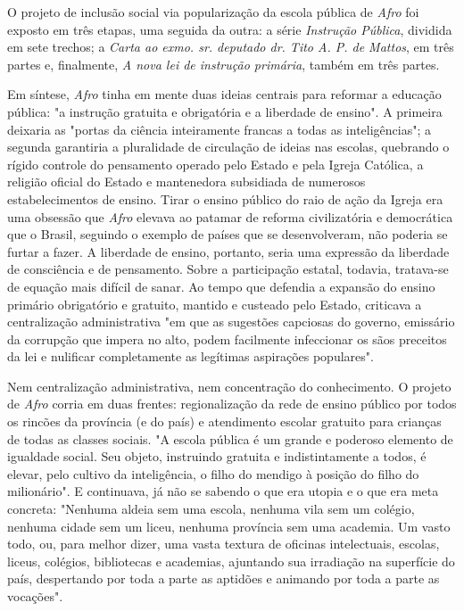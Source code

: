 O projeto de inclusão social via popularização da escola pública de
\emph{Afro} foi exposto em três etapas, uma seguida da outra: a série
\emph{Instrução Pública}, dividida em sete trechos; a \emph{Carta ao
exmo. sr. deputado dr. Tito A. P. de Mattos}, em três partes e,
finalmente, \emph{A nova lei de instrução primária}, também em três
partes.

Em síntese, \emph{Afro} tinha em mente duas ideias centrais para
reformar a educação pública: "a instrução gratuita e obrigatória e a
liberdade de ensino". A primeira deixaria as "portas da ciência
inteiramente francas a todas as inteligências"; a segunda garantiria a
pluralidade de circulação de ideias nas escolas, quebrando o rígido
controle do pensamento operado pelo Estado e pela Igreja Católica, a
religião oficial do Estado e mantenedora subsidiada de numerosos
estabelecimentos de ensino. Tirar o ensino público do raio de ação da
Igreja era uma obsessão que \emph{Afro} elevava ao patamar de reforma
civilizatória e democrática que o Brasil, seguindo o exemplo de países
que se desenvolveram, não poderia se furtar a fazer. A liberdade de
ensino, portanto, seria uma expressão da liberdade de consciência e de
pensamento. Sobre a participação estatal, todavia, tratava-se de equação
mais difícil de sanar. Ao tempo que defendia a expansão do ensino
primário obrigatório e gratuito, mantido e custeado pelo Estado,
criticava a centralização administrativa "em que as sugestões capciosas
do governo, emissário da corrupção que impera no alto, podem facilmente
infeccionar os sãos preceitos da lei e nulificar completamente as
legítimas aspirações populares".

Nem centralização administrativa, nem concentração do conhecimento. O
projeto de \emph{Afro} corria em duas frentes: regionalização da rede de
ensino público por todos os rincões da província (e do país) e
atendimento escolar gratuito para crianças de todas as classes sociais.
"A escola pública é um grande e poderoso elemento de igualdade social.
Seu objeto, instruindo gratuita e indistintamente a todos, é elevar,
pelo cultivo da inteligência, o filho do mendigo à posição do filho do
milionário". E continuava, já não se sabendo o que era utopia e o que
era meta concreta: "Nenhuma aldeia sem uma escola, nenhuma vila sem um
colégio, nenhuma cidade sem um liceu, nenhuma província sem uma
academia. Um vasto todo, ou, para melhor dizer, uma vasta textura de
oficinas intelectuais, escolas, liceus, colégios, bibliotecas e
academias, ajuntando sua irradiação na superfície do país, despertando
por toda a parte as aptidões e animando por toda a parte as vocações".

